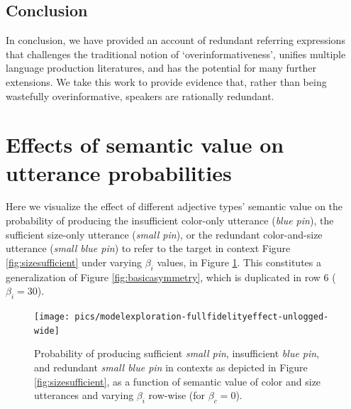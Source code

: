 \documentclass[11pt]{article}
\newcommand{\figref}[1]{Figure \ref{#1}}
\begin{document}
\subsection{Conclusion}
\label{sec:conclusion}

In conclusion, we have provided an account of redundant referring expressions that challenges the traditional notion of `overinformativeness', unifies multiple language production literatures, and has the potential for many further extensions. We take this work to provide evidence that, rather than being wastefully overinformative, speakers are rationally redundant.


\appendix

\section{Effects of semantic value on utterance probabilities}
\label{app:modelexploration}

Here we visualize the effect of different adjective types' semantic value on the probability of producing the insufficient color-only utterance (\emph{blue pin}), the sufficient size-only utterance (\emph{small pin}), or the redundant color-and-size utterance  (\emph{small blue pin}) to refer to the target in context \figref{fig:sizesufficient} under varying $\beta_i$ values, in \figref{fig:fullexploration}. This constitutes a generalization of \figref{fig:basicasymmetry}, which is duplicated in row 6 ($\beta_i = 30$).

\begin{figure}
\centering
\texttt{[image: pics/modelexploration-fullfidelityeffect-unlogged-wide]}
\caption{Probability of producing sufficient \emph{small pin}, insufficient \emph{blue pin}, and redundant \emph{small blue pin} in contexts as depicted in \figref{fig:sizesufficient}, as a function of semantic value of color and size utterances and varying $\beta_i$ row-wise (for $ \beta_c = 0$).}
\label{fig:fullexploration}
\end{figure}

%
%
\end{document}
